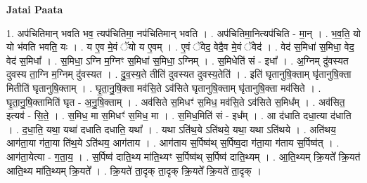 \documentclass[17pt]{extarticle}
\begin{document}
\textbf{Jatai Paata} \newline

1. अप॑चितिमान् भवति भव॒ त्यप॑चितिमा॒ नप॑चितिमान् भवति । . अप॑चितिमा॒नित्यप॑चिति - मा॒न् । . भ॒व॒ति॒ यो यो भ॑वति भवति॒ यः । . य ए॒व मे॒वं ॅयो य ए॒वम् । . ए॒वं ॅवेद॒ वेदै॒व मे॒वं ॅवेद॑ । . वेद॑ स॒मिधा॑ स॒मिधा॒ वेद॒ वेद॑ स॒मिधा᳚ । . स॒मिधा॒ ऽग्नि म॒ग्निꣳ स॒मिधा॑ स॒मिधा॒ ऽग्निम् । . स॒मिधेति॑ सं - इधा᳚ । . अ॒ग्निम् दु॑वस्यत दुवस्य ता॒ग्नि म॒ग्निम् दु॑वस्यत । . दु॒व॒स्य॒ते तीति॑ दुवस्यत दुवस्य॒तेति॑ । . इति॑ घृतानुषि॒क्ताम् घृ॑तानुषि॒क्ता मितीति॑ घृतानुषि॒क्ताम् । . घृ॒ता॒नु॒षि॒क्ता मव॑सि॒ते ऽव॑सिते घृतानुषि॒क्ताम् घृ॑तानुषि॒क्ता मव॑सिते । . घृ॒ता॒नु॒षि॒क्तामिति॑ घृत - अ॒नु॒षि॒क्ताम् । . अव॑सिते स॒मिधꣳ॑ स॒मिध॒ मव॑सि॒ते ऽव॑सिते स॒मिध᳚म् । . अव॑सित॒ इत्यव॑ - सि॒ते॒ । . स॒मिध॒ मा स॒मिधꣳ॑ स॒मिध॒ मा । . स॒मिध॒मिति॑ सं - इध᳚म् । . आ द॑धाति दधा॒त्या द॑धाति । . द॒धा॒ति॒ यथा॒ यथा॑ दधाति दधाति॒ यथा᳚ । . यथा ऽति॑थ॒ये ऽति॑थये॒ यथा॒ यथा ऽति॑थये । . अति॑थय॒ आग॑ता॒या ग॑ता॒या ति॑थ॒ये ऽति॑थय॒ आग॑ताय । . आग॑ताय स॒र्पिष्व॑थ् स॒र्पिष्व॒दा ग॑ता॒या ग॑ताय स॒र्पिष्व॑त् । . आग॑ता॒येत्या - ग॒ता॒य॒ । . स॒र्पिष्व॑ दाति॒थ्य मा॑ति॒थ्यꣳ स॒र्पिष्व॑थ् स॒र्पिष्व॑ दाति॒थ्यम् । . आ॒ति॒थ्यम् क्रि॒यते᳚ क्रि॒यत॑ आति॒थ्य मा॑ति॒थ्यम् क्रि॒यते᳚ । . क्रि॒यते॑ ता॒दृक् ता॒दृक् क्रि॒यते᳚ क्रि॒यते॑ ता॒दृक् । \newline
\end{document}

